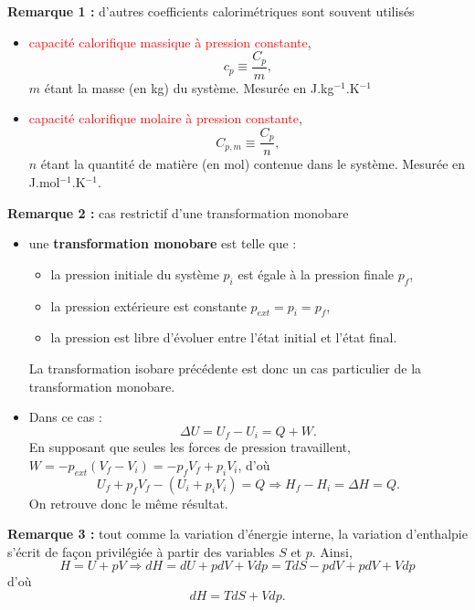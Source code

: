 \documentclass[11pt,a4paper]{report}
\begin{document}
\textbf{Remarque 1 :} d'autres coefficients calorimétriques sont souvent utilisés
\begin{itemize}
	\item \textcolor{red}{capacité calorifique massique à pression constante},
	\begin{equation}
		c_p \equiv \frac{C_p}{m},
	\end{equation}
	$m$ étant la masse (en kg) du système. Mesurée en J.kg$^{-1}$.K$^{-1}$
	\item \textcolor{red}{capacité calorifique molaire à pression constante},
	\begin{equation}
		C_{p,m} \equiv \frac{C_p}{n},
	\end{equation}
	$n$ étant la quantité de matière (en mol) contenue dans le système. Mesurée en J.mol$^{-1}$.K$^{-1}$.\\
\end{itemize}

\textbf{Remarque 2 :} cas restrictif d'une transformation monobare
\begin{itemize}
	\item une \textbf{transformation monobare} est telle que :
		\begin{itemize}
			\item la pression initiale du système $p_i$ est égale à la pression finale $p_f$,
			\item la pression extérieure est constante $p_{ext} = p_i = p_f$,
			\item la pression est libre d'évoluer entre l'état initial et l'état final.
		\end{itemize}
	La transformation isobare précédente est donc un cas particulier de la transformation monobare.
	\item Dans ce cas :
	\begin{equation}
		\Delta U = U_f - U_i = Q + W.
	\end{equation}
	En supposant que seules les forces de pression travaillent, $W = -p_{ext}(V_f - V_i) = -p_f V_f + p_i V_i$, d'où
	\begin{equation}
		U_f + p_f V_f - (U_i + p_i V_i) = Q \Rightarrow H_f - H_i = \Delta H = Q.
	\end{equation}
	On retrouve donc le même résultat.
\end{itemize}

\textbf{Remarque 3 :} tout comme la variation d'énergie interne, la variation d'enthalpie s'écrit de façon privilégiée à partir des variables $S$ et $p$.
Ainsi,
\begin{equation}
	H = U+pV \Rightarrow dH = dU + pdV + Vdp = TdS - pdV + pdV + Vdp
\end{equation}
d'où
\begin{equation}
	dH = TdS + Vdp.
\end{equation}
\end{document}
